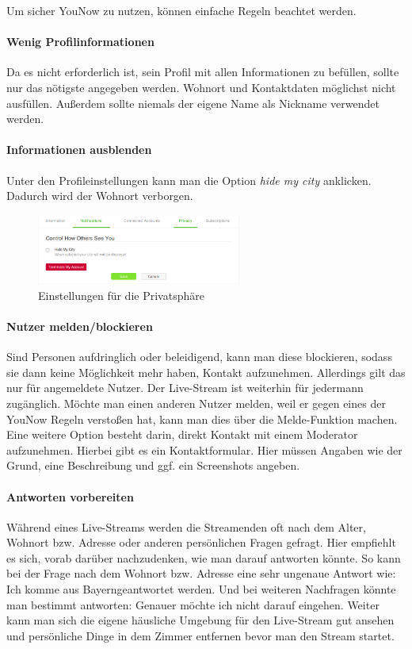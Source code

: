 Um sicher YouNow zu nutzen, können einfache Regeln beachtet werden. 

\paragraph{Wenig Profilinformationen}
Da es nicht erforderlich ist, sein Profil mit allen Informationen zu befüllen, sollte nur das nötigste angegeben werden. Wohnort und Kontaktdaten möglichst nicht ausfüllen. Außerdem sollte niemals der eigene Name als Nickname verwendet werden.




\paragraph{Informationen ausblenden}
Unter den Profileinstellungen kann man die Option \textit{hide my city} anklicken. Dadurch wird der Wohnort verborgen.

\begin{figure}[h!]
\centering
\includegraphics[width=0.6\textwidth]{./resources/younow_hide_my_city}
\caption{Einstellungen für die Privatsphäre}
\label{privats_einstellung}
\end{figure} 

\paragraph{Nutzer melden/blockieren}
Sind Personen aufdringlich oder beleidigend, kann man diese blockieren, sodass sie dann keine Möglichkeit mehr haben, Kontakt aufzunehmen. Allerdings gilt das nur für angemeldete Nutzer. Der Live-Stream ist weiterhin für jedermann zugänglich.
Möchte man einen anderen Nutzer melden, weil er gegen eines der YouNow Regeln verstoßen hat, kann man dies über die Melde-Funktion machen. Eine weitere Option besteht darin, direkt Kontakt mit einem Moderator aufzunehmen. Hierbei gibt es ein Kontaktformular. Hier müssen Angaben wie der Grund, eine Beschreibung und ggf. ein Screenshots angeben.

\paragraph{Antworten vorbereiten}
Während eines Live-Streams werden die Streamenden oft nach dem Alter, Wohnort bzw. Adresse oder anderen persönlichen Fragen gefragt. Hier empfiehlt es sich, vorab darüber nachzudenken, wie man darauf antworten könnte. So kann bei der Frage nach dem Wohnort bzw. Adresse eine sehr ungenaue Antwort wie: \glqq Ich komme aus Bayern\grqq geantwortet werden. Und bei weiteren Nachfragen könnte man bestimmt antworten: \glqq Genauer möchte ich nicht darauf eingehen\grqq .
Weiter kann man sich die eigene häusliche Umgebung für den Live-Stream gut ansehen und persönliche Dinge in dem Zimmer entfernen bevor man den Stream startet. 
